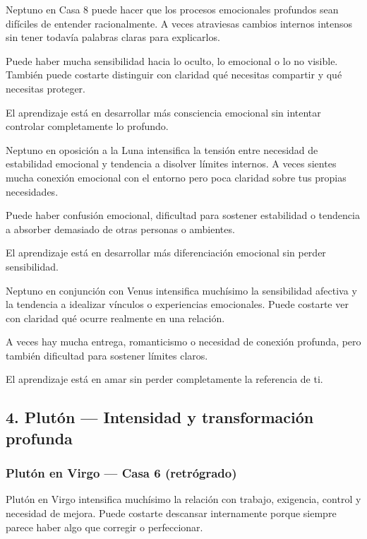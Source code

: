 \documentclass[11pt,a4paper]{article}
\begin{document}
Neptuno en Casa 8 puede hacer que los procesos emocionales profundos sean difíciles de entender racionalmente. A veces atraviesas cambios internos intensos sin tener todavía palabras claras para explicarlos.

Puede haber mucha sensibilidad hacia lo oculto, lo emocional o lo no visible. También puede costarte distinguir con claridad qué necesitas compartir y qué necesitas proteger.

El aprendizaje está en desarrollar más consciencia emocional sin intentar controlar completamente lo profundo.

Neptuno en oposición a la Luna intensifica la tensión entre necesidad de estabilidad emocional y tendencia a disolver límites internos. A veces sientes mucha conexión emocional con el entorno pero poca claridad sobre tus propias necesidades.

Puede haber confusión emocional, dificultad para sostener estabilidad o tendencia a absorber demasiado de otras personas o ambientes.

El aprendizaje está en desarrollar más diferenciación emocional sin perder sensibilidad.

Neptuno en conjunción con Venus intensifica muchísimo la sensibilidad afectiva y la tendencia a idealizar vínculos o experiencias emocionales. Puede costarte ver con claridad qué ocurre realmente en una relación.

A veces hay mucha entrega, romanticismo o necesidad de conexión profunda, pero también dificultad para sostener límites claros.

El aprendizaje está en amar sin perder completamente la referencia de ti.

\vspace{0.8cm}

\subsection{4. Plutón — Intensidad y transformación profunda}

\subsubsection*{Plutón en Virgo — Casa 6 (retrógrado)}

Plutón en Virgo intensifica muchísimo la relación con trabajo, exigencia, control y necesidad de mejora. Puede costarte descansar internamente porque siempre parece haber algo que corregir o perfeccionar.
\end{document}

